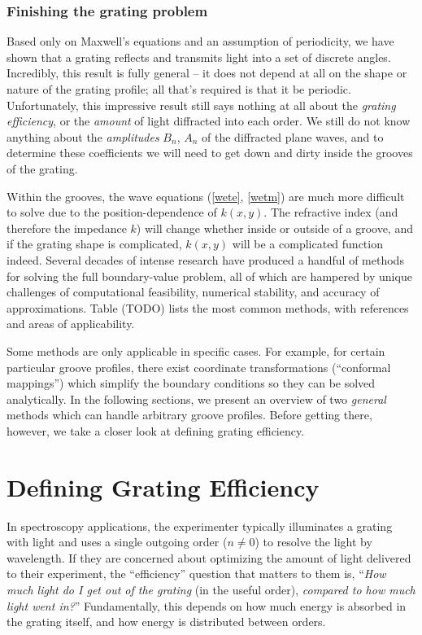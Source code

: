 \subsubsection{Finishing the grating problem}
Based only on Maxwell's equations and an assumption of periodicity, we have shown that a grating reflects and transmits light into a set of discrete angles.  Incredibly, this result is fully general -- it does not depend at all on the shape or nature of the grating profile; all that's required is that it be periodic.  Unfortunately, this impressive result still says nothing at all about the \emph{grating efficiency}, or the \emph{amount} of light diffracted into each order.  We still do not know anything about the \emph{amplitudes} $B_n$, $A_n$ of the diffracted plane waves, and to determine these coefficients we will need to get down and dirty inside the grooves of the grating.

Within the grooves, the wave equations (\ref{wete}, \ref{wetm}) are much more difficult to solve due to the position-dependence of $k(x,y)$.  The refractive index (and therefore the impedance $k$) will change whether inside or outside of a groove, and if the grating shape is complicated, $k(x,y)$ will be a complicated function indeed.  Several decades of intense research have produced a handful of methods for solving the full boundary-value problem, all of which are hampered by unique challenges of computational feasibility, numerical stability, and accuracy of approximations.  Table (TODO) lists the most common methods, with references and areas of applicability.   

Some methods are only applicable in specific cases.  For example, for certain particular groove profiles, there exist coordinate transformations (``conformal mappings'') which simplify the boundary conditions so they can be solved analytically.  In the following sections, we present an overview of two \emph{general} methods which can handle arbitrary groove profiles.  Before getting there, however, we take a closer look at defining grating efficiency.

\section{Defining Grating Efficiency}
In spectroscopy applications, the experimenter typically illuminates a grating with light and uses a single outgoing order ($n\neq0$) to resolve the light by wavelength.  If they are concerned about optimizing the amount of light delivered to their experiment, the ``efficiency'' question that matters to them is, ``\emph{How much light do I get out of the grating} (in the useful order), \emph{compared to how much light went in?}''  Fundamentally, this depends on how much energy is absorbed in the grating itself, and how energy is distributed between orders.

